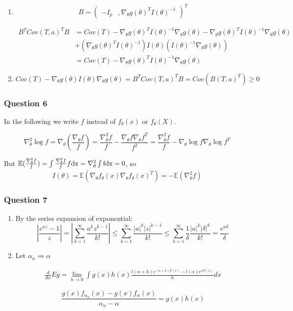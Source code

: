 \documentclass[12pt]{article}
\newcommand{\Q}[1]{\subsubsection*{Question #1}}
\newcommand{\Es}[1]{\mathbb{E}(#1)}
\begin{document}
\begin{enumerate}
\item
\[ B = \left(\begin{array}{cc}-I_p&,\nabla_\theta g(\theta)^T I(\theta)^{-1}\end{array}\right)^T \]

\begin{align}B^T Cov(T, a)^T B &= Cov(T) - \nabla_\theta g(\theta)^T I(\theta)^{-1}\nabla_\theta g(\theta) - \nabla_\theta g(\theta)^T I(\theta)^{-1}\nabla_\theta g(\theta) \\&+ (\nabla_\theta g(\theta)^T I(\theta)^{-1}) I(\theta) (I(\theta)^{-1} \nabla_\theta g(\theta) )\\
&= Cov(T) - \nabla_\theta g(\theta)^T I(\theta)^{-1} \nabla_\theta g(\theta)
\end{align}

\item $Cov(T) - \nabla_\theta g(\theta)I(\theta) \nabla_\theta g(\theta)  = B^T Cov(T, a)^T B = Cov( B(T, a)^T ) \geq 0$
\end{enumerate}

\Q{6}

In the following we write $f$ instead of $f_\theta(x)$ or $f_\theta(X)$.

$$\nabla_\theta^2 \log f = \nabla_\theta (\frac{\nabla_\theta f}{f}) = \frac{\nabla_\theta^2 f}{f} - \frac{\nabla_\theta f \nabla_\theta f^T}{f^2} = \frac{\nabla_\theta^2 f}{f} - \nabla_\theta \log f \nabla_\theta \log f^T$$


But $\Es {\frac{\nabla_\theta^2 f}{f}} = \int \frac{\nabla_\theta^2 f}{f} f \rm d x 
= \nabla_\theta ^2 \int f \rm d x = 0$, so
$$
I(\theta) = \Es{\nabla_\theta f_{\theta}(x) \nabla_\theta f_{\theta}(x)^T}  = - \Es{ \nabla_{\theta}^2 f}
$$

\Q{7}
\begin{enumerate}

\item
By the series expansion of exponential:
$$|\frac{e^{az} - 1}{z}| = |\sum_{k=1}^{\infty} \frac{a^kz^{k-1}}{k!}|
\leq \sum_{k=1}^{\infty} \frac{|a|^k|z|^{k-1}}{k!}
\leq \sum_{k=1}^{\infty} \frac{1}{\delta} \frac{|a|^k|\delta|^{k}}{k!}
=\frac{e^{a\delta}}{\delta} 
$$
\item
Let $\alpha_n \Rightarrow \alpha$

\begin{align}
\frac d {d\alpha} E g = \lim_{h\rightarrow0} \int g(x) h(x) \frac{l(\alpha+h) e^{(\alpha+h) T(x)} - l(\alpha) e^{\alpha T(x)}}{h} dx
\end{align}


$$\frac{g(x)f_{\alpha_n}(x) - g(x) f_\alpha(x)}{\alpha_n - \alpha} 
= g(x)h(x)
 $$ 

\end{enumerate}
\end{document}
